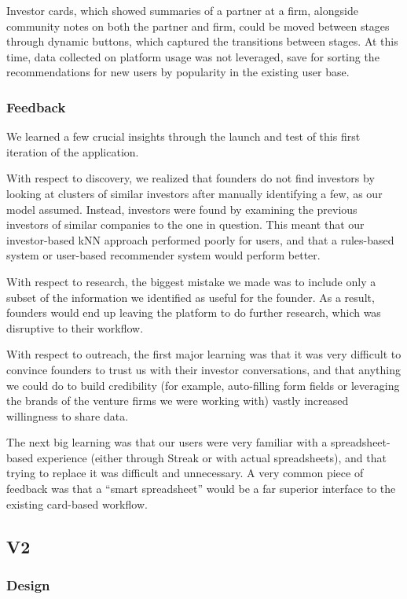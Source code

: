 Investor cards, which showed summaries of a partner at a firm, alongside community notes on both the partner and firm, could be moved between stages through dynamic buttons, which captured the transitions between stages. At this time, data collected on platform usage was not leveraged, save for sorting the recommendations for new users by popularity in the existing user base.

\subsubsection{Feedback}

We learned a few crucial insights through the launch and test of this first iteration of the application.

With respect to discovery, we realized that founders do not find investors by looking at clusters of similar investors after manually identifying a few, as our model assumed. Instead, investors were found by examining the previous investors of similar companies to the one in question. This meant that our investor-based kNN approach performed poorly for users, and that a rules-based system or user-based recommender system would perform better.

With respect to research, the biggest mistake we made was to include only a subset of the information we identified as useful for the founder. As a result, founders would end up leaving the platform to do further research, which was disruptive to their workflow.

With respect to outreach, the first major learning was that it was very difficult to convince founders to trust us with their investor conversations, and that anything we could do to build credibility (for example, auto-filling form fields or leveraging the brands of the venture firms we were working with) vastly increased willingness to share data.

The next big learning was that our users were very familiar with a spreadsheet-based experience (either through Streak or with actual spreadsheets), and that trying to replace it was difficult and unnecessary. A very common piece of feedback was that a ``smart spreadsheet'' would be a far superior interface to the existing card-based workflow.

\subsection{V2}

\subsubsection{Design}

